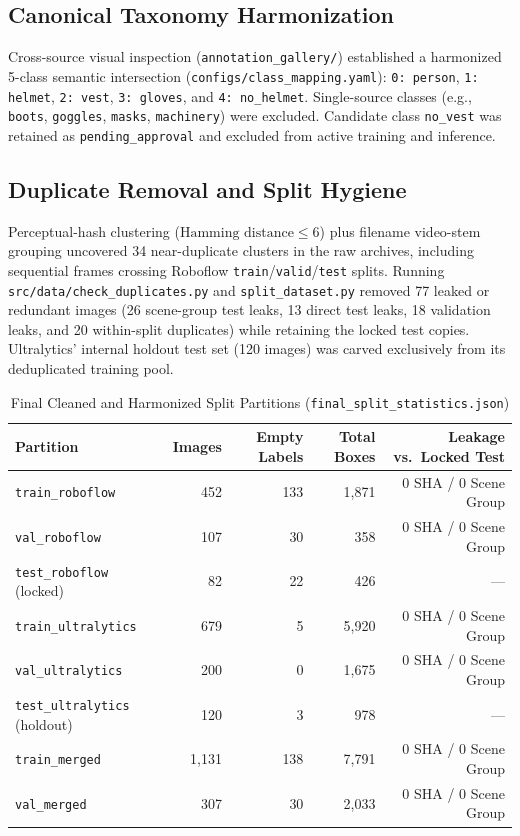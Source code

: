 \documentclass[11pt,a4paper]{article}
\begin{document}
\subsection{Canonical Taxonomy Harmonization}
Cross-source visual inspection (\texttt{annotation\_gallery/}) established a harmonized 5-class semantic intersection (\texttt{configs/class\_mapping.yaml}):
\texttt{0: person}, \texttt{1: helmet}, \texttt{2: vest}, \texttt{3: gloves}, and \texttt{4: no\_helmet}.
Single-source classes (e.g., \texttt{boots}, \texttt{goggles}, \texttt{masks}, \texttt{machinery}) were excluded. Candidate class \texttt{no\_vest} was retained as \texttt{pending\_approval} and excluded from active training and inference.

\subsection{Duplicate Removal and Split Hygiene}
Perceptual-hash clustering ($\text{Hamming distance} \le 6$) plus filename video-stem grouping uncovered 34 near-duplicate clusters in the raw archives, including sequential frames crossing Roboflow \texttt{train}/\texttt{valid}/\texttt{test} splits. Running \texttt{src/data/check\_duplicates.py} and \texttt{split\_dataset.py} removed 77 leaked or redundant images (26 scene-group test leaks, 13 direct test leaks, 18 validation leaks, and 20 within-split duplicates) while retaining the locked test copies. Ultralytics' internal holdout test set (120 images) was carved exclusively from its deduplicated training pool.

\begin{table}[H]
\centering
\caption{Final Cleaned and Harmonized Split Partitions (\texttt{final\_split\_statistics.json})}
\label{tab:splits}
\begin{tabular}{@{}lrrrr@{}}
\toprule
Partition & Images & Empty Labels & Total Boxes & Leakage vs.\ Locked Test \\
\midrule
\texttt{train\_roboflow} & 452 & 133 & 1,871 & 0 SHA / 0 Scene Group \\
\texttt{val\_roboflow} & 107 & 30 & 358 & 0 SHA / 0 Scene Group \\
\texttt{test\_roboflow} (locked) & 82 & 22 & 426 & --- \\
\texttt{train\_ultralytics} & 679 & 5 & 5,920 & 0 SHA / 0 Scene Group \\
\texttt{val\_ultralytics} & 200 & 0 & 1,675 & 0 SHA / 0 Scene Group \\
\texttt{test\_ultralytics} (holdout) & 120 & 3 & 978 & --- \\
\midrule
\texttt{train\_merged} & 1,131 & 138 & 7,791 & 0 SHA / 0 Scene Group \\
\texttt{val\_merged} & 307 & 30 & 2,033 & 0 SHA / 0 Scene Group \\
\bottomrule
\end{tabular}
\end{table}
\end{document}
